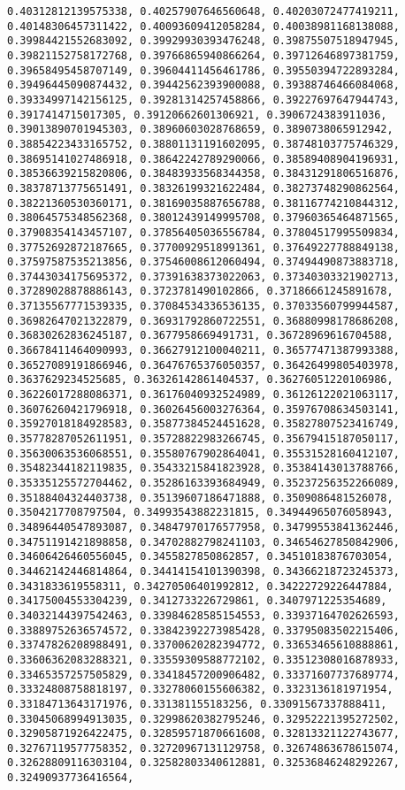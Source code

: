 \documentclass[11pt]{article}
\begin{document}
\begin{Verbatim}[commandchars=\\\{\}]
0.40312812139575338, 0.40257907646560648, 0.40203072477419211, 0.40148306457311422, 0.40093609412058284, 0.40038981168138088, 0.39984421552683092, 0.39929930393476248, 0.39875507518947945, 0.39821152758172768, 0.39766865940866264, 0.39712646897381759, 0.39658495458707149, 0.39604411456461786, 0.39550394722893284, 0.39496445090874432, 0.39442562393900088, 0.39388746466084068, 0.39334997142156125, 0.39281314257458866, 0.39227697647944743, 0.3917414715017305, 0.39120662601306921, 0.3906724383911036, 0.39013890701945303, 0.38960603028768659, 0.3890738065912942, 0.38854223433165752, 0.38801131191602095, 0.38748103775746329, 0.38695141027486918, 0.38642242789290066, 0.38589408904196931, 0.38536639215820806, 0.38483933568344358, 0.38431291806516876, 0.38378713775651491, 0.38326199321622484, 0.38273748290862564, 0.38221360530360171, 0.38169035887656788, 0.38116774210844312, 0.38064575348562368, 0.38012439149995708, 0.37960365464871565, 0.37908354143457107, 0.37856405036556784, 0.37804517995509834, 0.37752692872187665, 0.37700929518991361, 0.37649227788849138, 0.37597587535213856, 0.37546008612060494, 0.37494490873883718, 0.37443034175695372, 0.37391638373022063, 0.37340303321902713, 0.37289028878886143, 0.3723781490102866, 0.37186661245891678, 0.37135567771539335, 0.37084534336536135, 0.37033560799944587, 0.36982647021322879, 0.36931792860722551, 0.36880998178686208, 0.36830262836245187, 0.3677958669491731, 0.36728969616704588, 0.36678411464090993, 0.36627912100040211, 0.36577471387993388, 0.36527089191866946, 0.36476765376050357, 0.36426499805403978, 0.3637629234525685, 0.36326142861404537, 0.36276051220106986, 0.36226017288086371, 0.36176040932524989, 0.36126122021063117, 0.36076260421796918, 0.36026456003276364, 0.35976708634503141, 0.35927018184928583, 0.35877384524451628, 0.35827807523416749, 0.35778287052611951, 0.35728822983266745, 0.35679415187050117, 0.35630063536068551, 0.35580767902864041, 0.35531528160412107, 0.35482344182119835, 0.35433215841823928, 0.35384143013788766, 0.35335125572704462, 0.35286163393684949, 0.35237256352266089, 0.35188404324403738, 0.35139607186471888, 0.3509086481526078, 0.3504217708797504, 0.34993543882231815, 0.34944965076058943, 0.34896440547893087, 0.34847970176577958, 0.34799553841362446, 0.34751191421898858, 0.34702882798241103, 0.34654627850842906, 0.34606426460556045, 0.3455827850862857, 0.34510183876703054, 0.34462142446814864, 0.34414154101390398, 0.34366218723245373, 0.3431833619558311, 0.34270506401992812, 0.34222729226447884, 0.34175004553304239, 0.3412733226729861, 0.3407971225354689, 0.34032144397542463, 0.33984628585154553, 0.33937164702626593, 0.33889752636574572, 0.33842392273985428, 0.33795083502215406, 0.33747826208988491, 0.33700620282394772, 0.33653465610888861, 0.33606362083288321, 0.33559309588772102, 0.33512308016878933, 0.33465357257505829, 0.33418457200906482, 0.33371607737689774, 0.33324808758818197, 0.33278060155606382, 0.3323136181971954, 0.33184713643171976, 0.331381155183256, 0.33091567337888411, 0.33045068994913035, 0.32998620382795246, 0.32952221395272502, 0.32905871926422475, 0.32859571870661608, 0.32813321122743677, 0.32767119577758352, 0.32720967131129758, 0.32674863678615074, 0.32628809116303104, 0.32582803340612881, 0.32536846248292267, 0.32490937736416564, 
\end{Verbatim}
\end{document}
